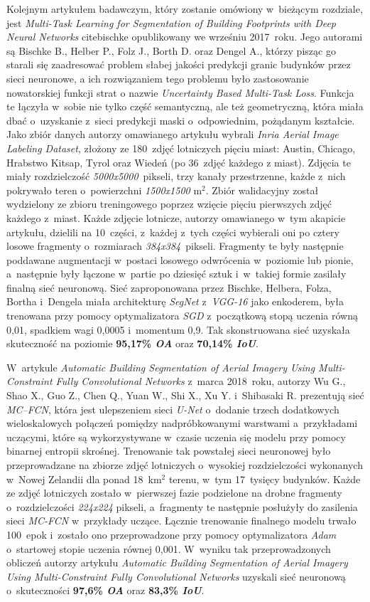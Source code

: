 Kolejnym artykułem badawczym, który zostanie omówiony w~bieżącym rozdziale, jest \emph{Multi-Task Learning for Segmentation of Building Footprints with Deep Neural Networks} cite{bischke} opublikowany we wrześniu 2017~roku. Jego autorami są Bischke B., Helber P., Folz J., Borth D. oraz Dengel A., którzy pisząc go starali się zaadresować problem słabej jakości predykcji granic budynków przez sieci neuronowe, a ich rozwiązaniem tego problemu było zastosowanie nowatorskiej funkcji strat o nazwie \emph{Uncertainty Based Multi-Task Loss}. Funkcja te łączyła w~sobie nie tylko część semantyczną, ale też geometryczną, która miała dbać o~uzyskanie z~sieci predykcji maski o~odpowiednim, pożądanym kształcie. Jako zbiór danych autorzy omawianego artykułu wybrali \emph{Inria Aerial Image Labeling Dataset}, złożony ze 180~zdjęć lotniczych pięciu miast: Austin, Chicago, Hrabstwo Kitsap, Tyrol oraz Wiedeń (po 36~zdjęć każdego z miast). Zdjęcia te miały rozdzielczość \emph{5000x5000}~pikseli, trzy kanały przestrzenne, każde z~nich pokrywało teren o~powierzchni \emph{1500x1500} m$^2$. Zbiór walidacyjny został wydzielony ze zbioru treningowego poprzez wzięcie pięciu pierwszych zdjęć każdego z~miast. Każde zdjęcie lotnicze, autorzy omawianego w~tym akapicie artykułu, dzielili na 10~części, z~każdej z~tych części wybierali oni po cztery losowe fragmenty o~rozmiarach \emph{384x384}~pikseli. Fragmenty te były następnie poddawane augmentacji w~postaci losowego odwrócenia w~poziomie lub pionie, a~następnie były łączone w~partie po dziesięć sztuk i~w~takiej formie zasilały finalną sieć neuronową. Sieć zaproponowana przez Bischke, Helbera, Folza, Bortha i~Dengela miała architekturę \emph{SegNet} z~\emph{VGG-16} jako enkoderem, była trenowana przy pomocy optymalizatora \emph{SGD} z~początkową stopą uczenia równą 0,01, spadkiem wagi 0,0005 i~momentum 0,9. Tak skonstruowana sieć uzyskała skuteczność na poziomie \textbf{95,17\% \emph{OA}} oraz \textbf{70,14\% \emph{IoU}}.

W~artykule \emph{Automatic Building Segmentation of Aerial Imagery Using Multi-Constraint Fully Convolutional Networks} \cite{wu} z~marca 2018~roku, autorzy Wu G., Shao X., Guo Z., Chen Q., Yuan W., Shi X., Xu Y. i~Shibasaki R. prezentują sieć \emph{MC–FCN}, która jest ulepszeniem sieci \emph{U-Net} o~dodanie trzech dodatkowych wieloskalowych połączeń pomiędzy nadpróbkowanymi warstwami a~przykładami uczącymi, które są wykorzystywane w~czasie uczenia się modelu przy pomocy binarnej entropii skrośnej. Trenowanie tak powstałej sieci neuronowej było przeprowadzane na zbiorze zdjęć lotniczych o~wysokiej rozdzielczości wykonanych w~Nowej Zelandii dla ponad 18~km$^2$ terenu, w~tym 17~tysięcy budynków. Każde ze zdjęć lotniczych zostało w~pierwszej fazie podzielone na drobne fragmenty o~rozdzielczości \emph{224x224} pikseli, a~fragmenty te następnie posłużyły do zasilenia sieci \emph{MC-FCN} w~przykłady uczące. Łącznie trenowanie finalnego modelu trwało 100~epok i~zostało ono przeprowadzone przy pomocy optymalizatora \emph{Adam} o~startowej stopie uczenia równej 0,001. W~wyniku tak przeprowadzonych obliczeń autorzy artykułu \emph{Automatic Building Segmentation of Aerial Imagery Using Multi-Constraint Fully Convolutional Networks} uzyskali sieć neuronową o~skuteczności \textbf{97,6\% \emph{OA}} oraz \textbf{83,3\% \emph{IoU}}.

